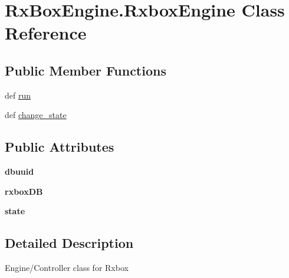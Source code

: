 \hypertarget{class_rx_box_engine_1_1_rxbox_engine}{
\section{RxBoxEngine.RxboxEngine Class Reference}
\label{class_rx_box_engine_1_1_rxbox_engine}
}
\subsection*{Public Member Functions}
\begin{DoxyCompactItemize}
\item 
def \hyperlink{class_rx_box_engine_1_1_rxbox_engine_adc0fa963405ce2c724c519eb8d7a2ef0}{run}
\item 
def \hyperlink{class_rx_box_engine_1_1_rxbox_engine_a4422088b356df39a943926fb799b4cf9}{change\_\-state}
\end{DoxyCompactItemize}
\subsection*{Public Attributes}
\begin{DoxyCompactItemize}
\item 
\hypertarget{class_rx_box_engine_1_1_rxbox_engine_abeb8130b896bfb752c37640ae757100b}{
{\bfseries dbuuid}}
\label{class_rx_box_engine_1_1_rxbox_engine_abeb8130b896bfb752c37640ae757100b}

\item 
\hypertarget{class_rx_box_engine_1_1_rxbox_engine_ac46747cdf03cc9cbfa315647a55ffbc9}{
{\bfseries rxboxDB}}
\label{class_rx_box_engine_1_1_rxbox_engine_ac46747cdf03cc9cbfa315647a55ffbc9}

\item 
\hypertarget{class_rx_box_engine_1_1_rxbox_engine_afc441ee0efbabc9e96cef01013226408}{
{\bfseries state}}
\label{class_rx_box_engine_1_1_rxbox_engine_afc441ee0efbabc9e96cef01013226408}

\end{DoxyCompactItemize}


\subsection{Detailed Description}
\begin{DoxyVerb}
    Engine/Controller class for Rxbox
    \end{DoxyVerb}
 

